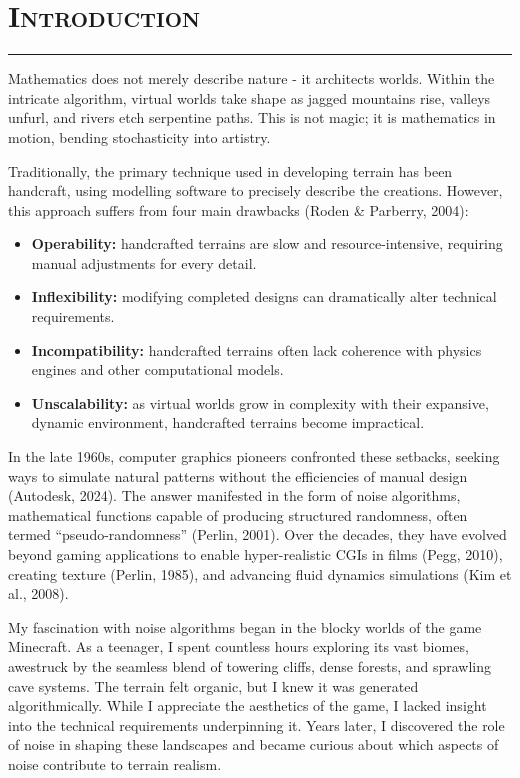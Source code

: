 \section{\textsc{Introduction}}
\hrule height 0.5pt
\vspace*{2.5pt}
Mathematics does not merely describe nature - it architects worlds. Within the
intricate algorithm, virtual worlds take shape as jagged mountains rise, valleys
unfurl, and rivers etch serpentine paths. This is not magic; it is mathematics in
motion, bending stochasticity into artistry. 

Traditionally, the primary technique used in developing terrain has been handcraft,
using modelling software to precisely describe the creations. However, this approach
suffers from four main drawbacks (Roden \& Parberry, 2004):
\begin{itemize}
    \item \textbf{Operability:} handcrafted terrains are slow and resource-intensive, requiring
    manual adjustments for every detail.
    \item \textbf{Inflexibility:} modifying completed designs can dramatically alter technical
    requirements.
    \item \textbf{Incompatibility:} handcrafted terrains often lack coherence with physics engines
    and other computational models.
    \item \textbf{Unscalability:} as virtual worlds grow in complexity with their expansive, dynamic
    environment, handcrafted terrains become impractical.
\end{itemize}
In the late 1960s, computer graphics pioneers confronted these setbacks, seeking ways to simulate natural
patterns without the efficiencies of manual design (Autodesk, 2024). The answer manifested in the form of
noise algorithms, mathematical functions capable of producing structured randomness, often termed ``pseudo-randomness''
(Perlin, 2001). Over the decades, they have evolved beyond gaming applications to enable hyper-realistic CGIs in films
(Pegg, 2010), creating texture (Perlin, 1985), and advancing fluid dynamics simulations (Kim et al., 2008). 

My fascination with noise algorithms began in the blocky worlds of the game Minecraft. As a teenager, I spent countless
hours exploring its vast biomes, awestruck by the seamless blend of towering cliffs, dense forests, and sprawling cave systems.
The terrain felt organic, but I knew it was generated algorithmically. While I appreciate the aesthetics of the game, I lacked
insight into the technical requirements underpinning it. Years later, I discovered the role of noise in shaping these landscapes
and became curious about which aspects of noise contribute to terrain realism. 

